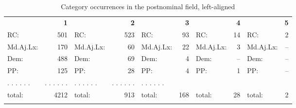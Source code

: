 \documentclass[output=paper,colorlinks,citecolor=brown,draft]{langscibook}
\begin{document}
\begin{table}
\caption{Category occurrences in the postnominal field, left-aligned }
\label{tab:probprab}
%
%
%
%
 \begin{tabularx}{\textwidth}{X@{}r l@{}r X@{}r X@{}r l@{}r}
  \lsptoprule

    &\textbf{1} && \textbf{2} && \textbf{3} && \textbf{4} &&\textbf{5} \\
        \cmidrule(lr){1-2}\cmidrule(lr){3-4}\cmidrule(lr){5-6}\cmidrule(lr){7-8}\cmidrule{9-10}
    RC:&  501       &  RC:&  523    &   RC:&  93   &  RC:&  14      &  RC:&  2     \\

    Md.Aj.Lx:&  170  & Md.Aj.Lx:&  60 &   Md.Aj.Lx:&  22     & Md.Aj.Lx:&  3      & Md.Aj.Lx:&  --  \\

    Dem:&  488       &  Dem:&  69     &  Dem:&  4     &   Dem:&  --     &  Dem:&  --      \\
    PP:&  125         &  PP:&  28        & PP:&  4 & PP:&  1  & PP:&  -- \\
    . .	. . . .     & . . . . . .	& . . . . . .   &. . . . . .	& . . . . . .	 	\\
        \cmidrule(lr){1-2}\cmidrule(lr){3-4}\cmidrule(lr){5-6}\cmidrule(lr){7-8}\cmidrule{9-10}
    total:&  4212     &  total:&  913  &  total:&  168  & total:&  28    &  total:&  2     \\

   \lspbottomrule
 \end{tabularx}
\end{table} 
\end{document}
